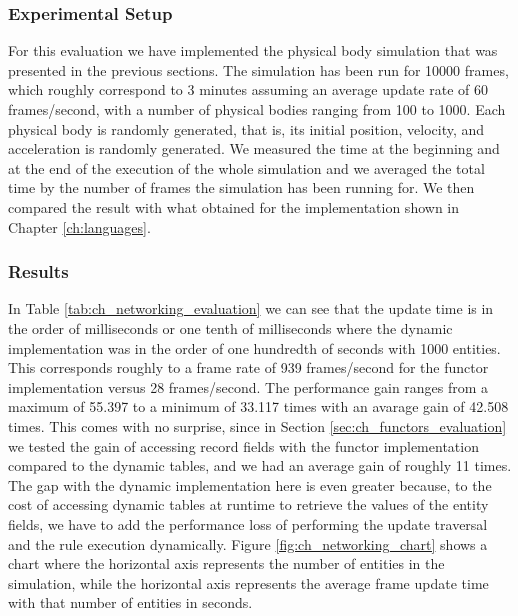 \subsubsection{Experimental Setup}
For this evaluation we have implemented the physical body simulation that was presented in the previous sections. The simulation has been run for 10000 frames, which roughly correspond to 3 minutes assuming an average update rate of 60 frames/second, with a number of physical bodies ranging from 100 to 1000. Each physical body is randomly generated, that is, its initial position, velocity, and acceleration is randomly generated. We measured the time at the beginning and at the end of the execution of the whole simulation and we averaged the total time by the number of frames the simulation has been running for. We then compared the result with what obtained for the implementation shown in Chapter \ref{ch:languages}.

\subsubsection{Results}
In Table \ref{tab:ch_networking_evaluation} we can see that the update time is in the order of milliseconds or one tenth of milliseconds where the dynamic implementation was in the order of one hundredth of seconds with 1000 entities. This corresponds roughly to a frame rate of 939 frames/second for the functor implementation versus 28 frames/second. The performance gain ranges from a maximum of 55.397 to a minimum of 33.117 times with an avarage gain of 42.508 times. This comes with no surprise, since in Section \ref{sec:ch_functors_evaluation} we tested the gain of accessing record fields with the functor implementation compared to the dynamic tables, and we had an average gain of roughly 11 times. The gap with the dynamic implementation here is even greater because, to the cost of accessing dynamic tables at runtime to retrieve the values of the entity fields, we have to add the performance loss of performing the update traversal and the rule execution dynamically. Figure \ref{fig:ch_networking_chart} shows a chart where the horizontal axis represents the number of entities in the simulation, while the horizontal axis represents the average frame update time with that number of entities in seconds.

